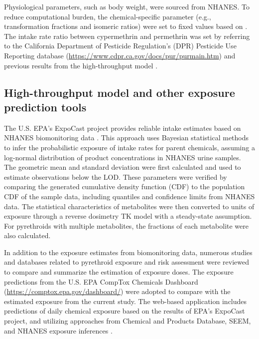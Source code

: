 \documentclass[toxics,article,submit,pdftex,moreauthors]{Definitions/mdpi}
\begin{document}
Physiological parameters, such as body weight, were sourced from NHANES.
To reduce computational burden, the chemical-specific parameter (e.g.,
transformation fractions and isomeric ratios) were set to fixed values
based on \citet{quindroit2019estimating}. The intake rate ratio between
cypermethrin and permethrin was set by referring to the California
Department of Pesticide Regulation's (DPR) Pesticide Use Reporting
database (\url{https://www.cdpr.ca.gov/docs/pur/purmain.htm}) and
previous results from the high-throughput model
\citep{stanfield2022bayesian}.

\subsection{High-throughput model and other exposure prediction
tools}\label{high-throughput-model-and-other-exposure-prediction-tools}

The U.S. EPA's ExpoCast project provides reliable intake estimates based
on NHANES biomonitoring data \citep{wambaugh2013high}. This approach
uses Bayesian statistical methods to infer the probabilistic exposure of
intake rates for parent chemicals, assuming a log-normal distribution of
product concentrations in NHANES urine samples. The geometric mean and
standard deviation were first calculated and used to estimate
observations below the LOD. These parameters were verified by comparing
the generated cumulative density function (CDF) to the population CDF of
the sample data, including quantiles and confidence limits from NHANES
data. The statistical characteristics of metabolites were then converted
to units of exposure through a reverse dosimetry TK model with a
steady-state assumption. For pyrethroids with multiple metabolites, the
fractions of each metabolite were also calculated.

In addition to the exposure estimates from biomonitoring data, numerous
studies and databases related to pyrethroid exposure and risk assessment
were reviewed to compare and summarize the estimation of exposure doses.
The exposure predictions from the U.S. EPA CompTox Chemicals Dashboard
(\url{https://comptox.epa.gov/dashboard/}) were adopted to compare with
the estimated exposure from the current study. The web-based application
includes predictions of daily chemical exposure based on the results of
EPA's ExpoCast project, and utilizing approaches from Chemical and
Products Database, SEEM, and NHANES exposure inferences
\citep{dionisio2018chemical, wambaugh2022exposure}.
\end{document}
